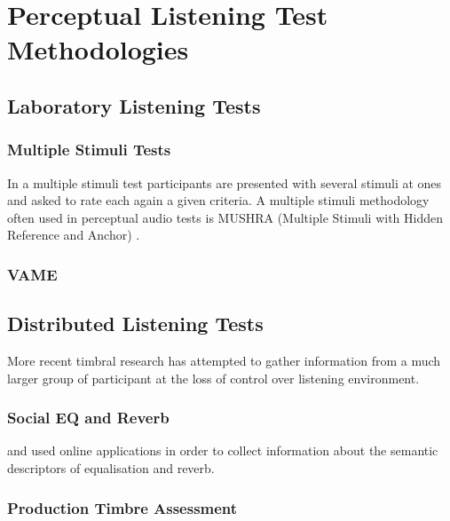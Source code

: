 \chapter{Perceptual Listening Test Methodologies}
\label{chap:SAFE}

\section{Laboratory Listening Tests}
\label{sec:Laboratory-Listening-Tests}

\subsection{Multiple Stimuli Tests}
\label{sec:Multiple-Stimuli-Tests}
	In a multiple stimuli test participants are presented with several stimuli at ones and asked to rate each again a
	given criteria. A multiple stimuli methodology often used in perceptual audio tests is MUSHRA (Multiple Stimuli with
	Hidden Reference and Anchor) \citep{mushra2014}.

\subsection{VAME}
\label{sec:VAME}
\citet{kendall1993verbal1, kendall1993verbal2}

\section{Distributed Listening Tests}
\label{sec:Distributed-Listening-Tests}
	More recent timbral research has attempted to gather information from a much larger group of participant at the loss
	of control over listening environment.

\subsection{Social EQ and Reverb}
\label{sec:Social-EQ-and-Reverb}
	\citet{cartwright2013socialeq} and \citet{seetharaman2014crowdsourcing} used online applications in order to collect
	information about the semantic descriptors of equalisation and reverb.

\subsection{Production Timbre Assessment}
\label{sec:Production-Timbre-Assessment}
